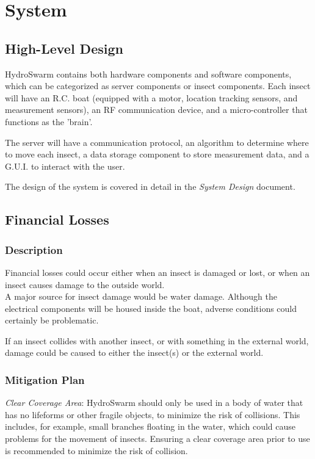 \documentclass[11pt]{article}
\begin{document}
\section{System}
\subsection{High-Level Design}

HydroSwarm contains both hardware components and software components, which can be categorized as
server components or insect components. Each insect will have an R.C. boat (equipped with a motor,
location tracking sensors, and measurement sensors), an RF communication device, and a micro-controller
that functions as the 'brain'.

The server will have a communication protocol, an algorithm to determine where to move each insect,
a data storage component to store measurement data, and a G.U.I. to interact with the user.

The design of the system is covered in detail in the \textit{System Design} document.

\subsection{Financial Losses}
\subsubsection*{Description}
Financial losses could occur either when an insect is damaged or lost, or when an insect causes
damage to the outside world. \\

A major source for insect damage would be water damage. Although the electrical components will be
housed inside the boat, adverse conditions could certainly be problematic.

If an insect collides with another insect, or with something in the external world, damage could be
caused to either the insect(s) or the external world.
\subsubsection*{Mitigation Plan}
\textit{Clear Coverage Area}: HydroSwarm should only be used in a body of water that has no
lifeforms or other fragile objects, to minimize the risk of collisions. This includes, for example,
small branches floating in the water, which could cause problems for the movement of insects.
Ensuring a clear coverage area prior to use is recommended to minimize the risk of collision.
\end{document}
